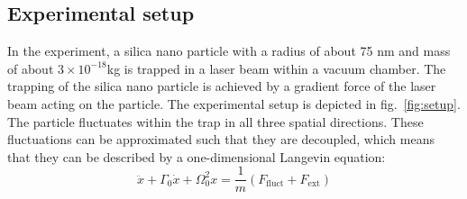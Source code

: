 \documentclass[12pt]{article}
\begin{document}
\subsection{Experimental setup}
In the experiment, a silica nano particle with a radius of about 75 nm and mass of about $3 \times 10^{-18}$kg is trapped in a laser beam within a
vacuum chamber. The trapping of the silica nano particle is achieved by a gradient force of the
laser beam acting on the particle. The experimental setup is depicted in fig.~\ref{fig:setup}.\\
The particle fluctuates within the trap in all three spatial directions. These fluctuations can be approximated
such that they are decoupled, which means that they can be described by a one-dimensional Langevin equation:
\begin{equation}
    \ddot{x} + \Gamma_0 \dot{x} + \Omega^2_0x = \frac 1 m \left(F_\text{fluct} + F_\text{ext}\right)
\end{equation}
\end{document}
